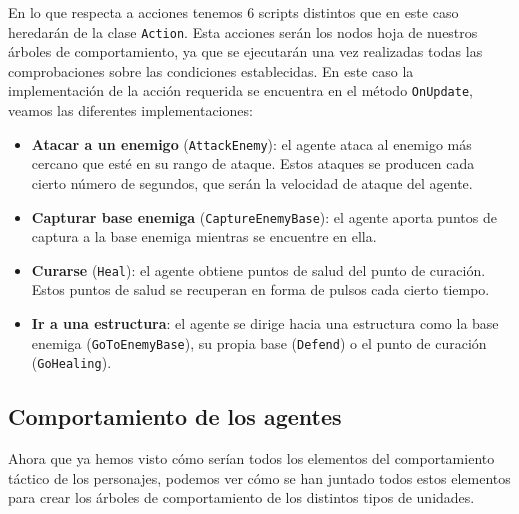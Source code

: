 En lo que respecta a acciones tenemos 6 scripts distintos que en este caso heredarán de la clase \texttt{Action}. Esta acciones serán los nodos hoja de nuestros árboles de comportamiento, ya que se ejecutarán una vez realizadas todas las comprobaciones sobre las condiciones establecidas. En este caso la implementación de la acción requerida se encuentra en el método \texttt{OnUpdate}, veamos las diferentes implementaciones:

\begin{itemize}
    \item \textbf{Atacar a un enemigo} (\texttt{AttackEnemy}): el agente ataca al enemigo más cercano que esté en su rango de ataque. Estos ataques se producen cada cierto número de segundos, que serán la velocidad de ataque del agente.
    
        
    
    \item \textbf{Capturar base enemiga} (\texttt{CaptureEnemyBase}): el agente aporta puntos de captura a la base enemiga mientras se encuentre en ella.
        
        
        
    \item \textbf{Curarse} (\texttt{Heal}): el agente obtiene puntos de salud del punto de curación. Estos puntos de salud se recuperan en forma de pulsos cada cierto tiempo.
        
        
        
    \item \textbf{Ir a una estructura}: el agente se dirige hacia una estructura como la base enemiga (\texttt{GoToEnemyBase}), su propia base (\texttt{Defend}) o el punto de curación (\texttt{GoHealing}).
    
        
\end{itemize}


\subsection{Comportamiento de los agentes}
Ahora que ya hemos visto cómo serían todos los elementos del comportamiento táctico de los personajes, podemos ver cómo se han juntado todos estos elementos para crear los árboles de comportamiento de los distintos tipos de unidades.
